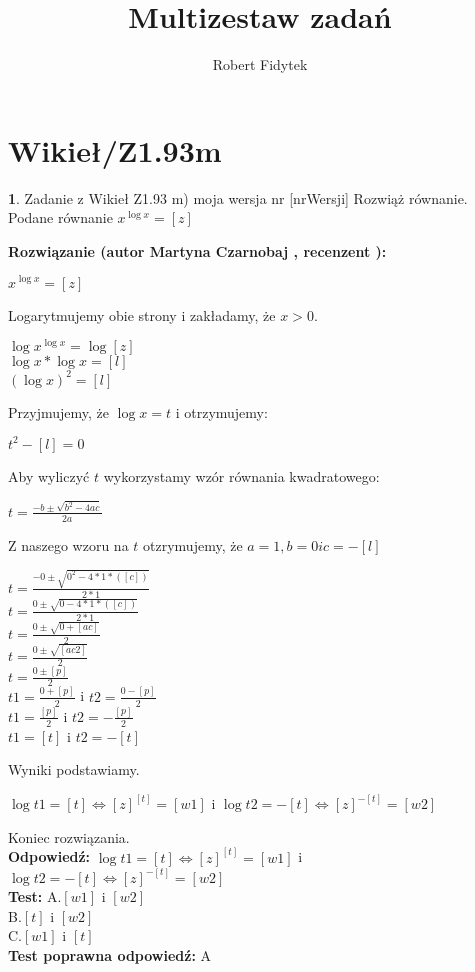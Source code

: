 \documentclass[12pt, a4paper]{article}
\title{Multizestaw zadań}
\author{Robert Fidytek}
\date{}
\theoremstyle{definition} %
\newtheorem{zad}{}
\newcommand{\kategoria}[1]{\section{#1}} %
\newcommand{\zadStart}[1]{\begin{zad}#1\newline} %
\newcommand{\zadStop}{\end{zad}}   %
\newcommand{\rozwStart}[2]{\noindent \textbf{Rozwiązanie (autor #1 , recenzent #2): }\newline} %
\newcommand{\rozwStop}{\newline}                                            %
\newcommand{\odpStart}{\noindent \textbf{Odpowiedź:}\newline}    %
\newcommand{\odpStop}{\newline}                                             %
\newcommand{\testStart}{\noindent \textbf{Test:}\newline} %
\newcommand{\testStop}{\newline} %
\newcommand{\kluczStart}{\noindent \textbf{Test poprawna odpowiedź:}\newline} %
\newcommand{\kluczStop}{\newline} %
\begin{document}
\maketitle


\kategoria{Wikieł/Z1.93m}
\zadStart{Zadanie z Wikieł Z1.93 m) moja wersja nr [nrWersji]}
Rozwiąż równanie.\\
Podane równanie $ x^{\log x} = [z] $\\
\zadStop
\rozwStart{Martyna Czarnobaj}{}
\begin{center}
	$ x^{\log x} = [z] $\\
\end{center}
	Logarytmujemy obie strony i zakładamy, że $ x>0 $.\\
\begin{center}
	$ \log x^{\log x} = \log [z] $\\
	$ \log x * \log x = [l] $\\
	$ (\log x)^{2}=[l] $\\
\end{center}
Przyjmujemy, że $ \log x = t $ i otrzymujemy:\\
\begin{center}
$ t^{2} - [l] = 0 $\\	 
\end{center}
Aby wyliczyć $ t $ wykorzystamy wzór równania kwadratowego:\\
\begin{center}
	$ t = \frac{-b \pm \sqrt{b^{2} - 4ac}}{2a} $
\end{center}
Z naszego wzoru na $ t $ otzrymujemy, że $ a = 1, b = 0 i c = -[l] $\\
\begin{center}
	$ t = \frac{-0 \pm \sqrt{0^{2}-4*1*([c])}}{2*1} $\\
	$ t = \frac{0 \pm \sqrt{0-4*1*([c])}}{2*1} $\\
	$ t = \frac{0 \pm \sqrt{0+[ac]}}{2} $\\
	$ t = \frac{0 \pm \sqrt{[ac2]}}{2} $\\
	$ t = \frac{0 \pm [p]}{2} $\\
	$ t1 = \frac{0 + [p]}{2} $ i $ t2 = \frac{0 - [p]}{2} $\\
	$ t1 = \frac{[p]}{2} $ i $ t2 = -\frac{[p]}{2} $\\
	$ t1 = [t] $ i $ t2 = -[t] $\\
\end{center}
Wyniki podstawiamy.
\begin{center}
	$ \log t1  = [t] \iff [z]^{[t]}=[w1] $ i $ \log t2 = -[t] \iff [z]^{-[t]}=[w2]$\\
\end{center}
Koniec rozwiązania.\\
\rozwStop
\odpStart
$ \log t1  = [t] \iff [z]^{[t]}=[w1] $ i $ \log t2 = -[t] 
\iff [z]^{-[t]}=[w2]$\\
\odpStop
\testStart
A.$ [w1] $ i $ [w2]$\\
B.$ [t] $ i $ [w2]$\\
C.$ [w1] $ i $ [t]$\\
\testStop
\kluczStart
A
\kluczStop
\end{document}
